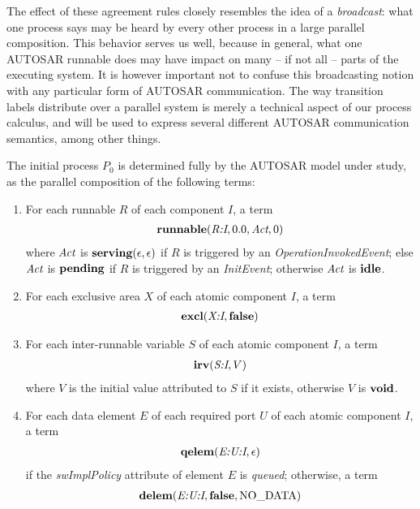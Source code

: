 \documentclass[twocolumn]{article}
\newcommand{\V}[1]{\mbox{\it #1}}
\newcommand{\Act}{\V{Act}}
\newcommand{\void}{\mbox{\bf void}}
\newcommand{\false}{\mbox{\bf false}}
\newcommand{\idle}{\mbox{\bf idle}}
\newcommand{\pending}{\mbox{\bf pending}}
\newcommand{\serving}[2]{\mbox{\bf serving}(#1,#2)}
\newcommand{\adr}[1]{\mbox{\em #1}}
\newcommand{\runnable}[4]{\mbox{\bf runnable}(#1,#2,#3,#4)}
\newcommand{\excl}[2]{\mbox{\bf excl}(#1,#2)}
\newcommand{\irv}[2]{\mbox{\bf irv}(#1,#2)}
\newcommand{\qelem}[2]{\mbox{\bf qelem}(#1,#2)}
\newcommand{\delem}[3]{\mbox{\bf delem}(#1,#2,#3)}
\begin{document}
The effect of these agreement rules closely resembles the idea of a {\em broadcast}: what one process says may be heard by every other process in a large parallel composition. This behavior serves us well, because in general, what one AUTOSAR runnable does may have impact on many -- if not all -- parts of the executing system. It is however important not to confuse this broadcasting notion with any particular form of AUTOSAR communication. The way transition labels distribute over a parallel system is merely a technical aspect of our process calculus, and will be used to express several different AUTOSAR communication semantics, among other things. 

The initial process $P_0$ is determined fully by the AUTOSAR model under study, as the parallel composition of the following terms:
\begin{enumerate}

\item For each runnable $R$ of each component $I$, a term
$$
\begin{array}{c}
	\runnable{\adr{R:I}}{0.0}{\Act}{0}
\end{array}
$$
where $\Act$ is $\serving{\epsilon}{\epsilon}$ if $R$ is triggered by an {\em OperationInvokedEvent}; else $\Act$ is $\pending$ if $R$ is triggered by an {\em InitEvent}; otherwise $\Act$ is $\idle$.

\item For each exclusive area $X$ of each atomic component $I$, a term
$$
\begin{array}{c}
	\excl{\adr{X:I}}{\false}
\end{array}
$$

\item For each inter-runnable variable $S$ of each atomic component $I$, a term
$$
\begin{array}{c}
	\irv{\adr{S:I}}{V}
\end{array}
$$
where $V$ is the initial value attributed to $S$ if it exists, otherwise $V$ is $\void$.

\item For each data element $E$ of each required port $U$ of each atomic component $I$, a term
$$
\begin{array}{c}
	\qelem{\adr{E:U:I}}{\epsilon}
\end{array}
$$
if the {\em swImplPolicy} attribute of element $E$ is {\em queued}; otherwise, a term
$$
\begin{array}{c}
	\delem{\adr{E:U:I}}{\false}{\mbox{NO\_DATA}}
\end{array}
$$


\end{enumerate}
\end{document}
